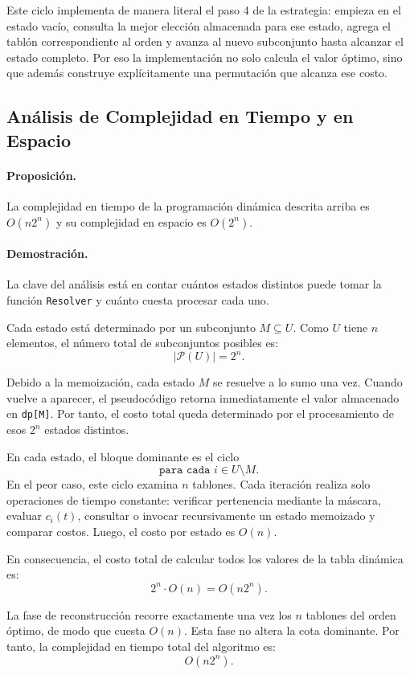 \documentclass[12pt,a4paper]{article}
\newcommand{\cost}[1]{c_{#1}}
\begin{document}
Este ciclo implementa de manera literal el paso 4 de la estrategia: empieza en el estado vac\'io, consulta la mejor elecci\'on almacenada para ese estado, agrega el tabl\'on correspondiente al orden y avanza al nuevo subconjunto hasta alcanzar el estado completo. Por eso la implementaci\'on no solo calcula el valor \'optimo, sino que adem\'as construye expl\'icitamente una permutaci\'on que alcanza ese costo.

\subsection{An\'alisis de Complejidad en Tiempo y en Espacio}

\paragraph{Proposici\'on.}
La complejidad en tiempo de la programaci\'on din\'amica descrita arriba es \(O(n2^n)\) y su complejidad en espacio es \(O(2^n)\).

\paragraph{Demostraci\'on.}
La clave del an\'alisis est\'a en contar cu\'antos estados distintos puede tomar la funci\'on \texttt{Resolver} y cu\'anto cuesta procesar cada uno.

Cada estado est\'a determinado por un subconjunto \(M \subseteq U\). Como \(U\) tiene \(n\) elementos, el n\'umero total de subconjuntos posibles es:
\[
|\mathcal{P}(U)|=2^n.
\]

Debido a la memoizaci\'on, cada estado \(M\) se resuelve a lo sumo una vez. Cuando vuelve a aparecer, el pseudoc\'odigo retorna inmediatamente el valor almacenado en \texttt{dp[M]}. Por tanto, el costo total queda determinado por el procesamiento de esos \(2^n\) estados distintos.

En cada estado, el bloque dominante es el ciclo
\[
\texttt{para cada } i \in U \setminus M.
\]
En el peor caso, este ciclo examina \(n\) tablones. Cada iteraci\'on realiza solo operaciones de tiempo constante: verificar pertenencia mediante la m\'ascara, evaluar \(\cost{i}(t)\), consultar o invocar recursivamente un estado memoizado y comparar costos. Luego, el costo por estado es \(O(n)\).

En consecuencia, el costo total de calcular todos los valores de la tabla din\'amica es:
\[
2^n \cdot O(n)=O(n2^n).
\]

La fase de reconstrucci\'on recorre exactamente una vez los \(n\) tablones del orden \'optimo, de modo que cuesta \(O(n)\). Esta fase no altera la cota dominante. Por tanto, la complejidad en tiempo total del algoritmo es:
\[
O(n2^n).
\]
\end{document}
